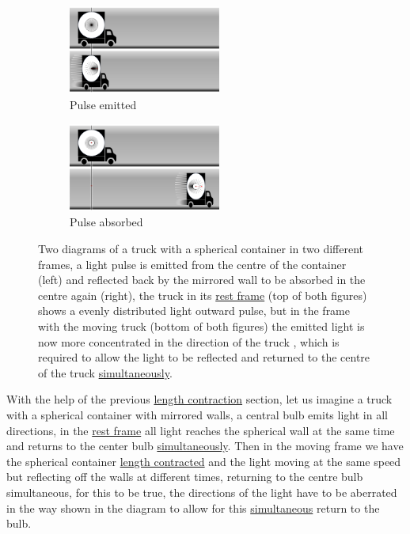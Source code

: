 \begin{figure}[htbp]
	\begin{subfigure}{.49\textwidth}
		\centering
		\includegraphics[width=5cm]{images/pdf/Aberrated_lorrys_1.pdf}
		\caption{Pulse emitted}
		\label{fig: truck aberrated 1}
	\end{subfigure}
	\begin{subfigure}{.49\textwidth}
		\centering
		\includegraphics[width=5cm]{images/pdf/Aberrated_lorrys_2.pdf}
		\caption{Pulse absorbed}
		\label{fig: truck aberrated 2}
	\end{subfigure}
	\caption{Two diagrams of a truck with a spherical container in two different frames, a light pulse is emitted from the centre of the container (left) and reflected back by the mirrored wall to be absorbed in the centre again (right), the truck in its \protect\hyperlink{def-proper-frame}{rest frame} (top of both figures) shows a evenly distributed light outward pulse, but in the frame with the moving truck (bottom of both figures) the emitted light is now more concentrated in the direction of the truck , which is required to allow the light to be reflected and returned to the centre of the truck \protect\hyperlink{def-simultaneity}{simultaneously}.}
	\label{fig: truck aberrated}
\end{figure}

With the help of the previous \hyperlink{def-length-contraction}{length contraction} section, let us imagine a truck with a spherical container with mirrored walls, a central bulb emits light in all directions, in the \hyperlink{def-proper-frame}{rest frame} all light reaches the spherical wall at the same time and returns to the center bulb \hyperlink{def-simultaneity}{simultaneously}.
Then in the moving frame we have the spherical container \hyperlink{def-length-contraction}{length contracted} and the light moving at the same speed but reflecting off the walls at different times, returning to the centre bulb simultaneous, for this to be true, the directions of the light have to be aberrated in the way shown in the diagram to allow for this \hyperlink{def-simultaneity}{simultaneous} return to the bulb.

